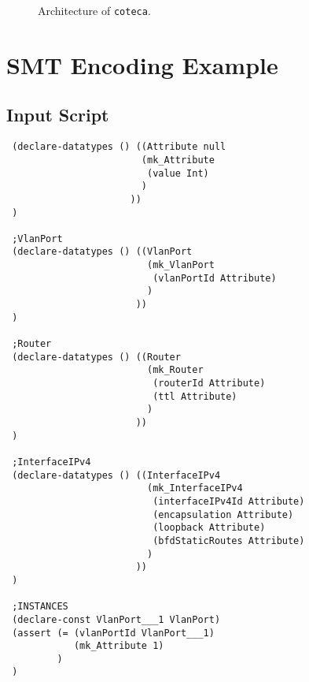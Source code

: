 \documentclass[12pt,swedish,english]{report}
\theoremstyle{definition}
\begin{document}
\begin{appendices}
\begin{figure}[h]
 \caption{Architecture of \texttt{coteca}.}
 \label{fig:architecture}

 \end{figure}
 
 
 \chapter{SMT Encoding Example}\label{app:smtOutput}
 
 \section{Input Script}
 \begin{verbatim}
 (declare-datatypes () ((Attribute null
 	                    (mk_Attribute
 	                     (value Int)
 	                    )
 	                  ))
 )
 
 ;VlanPort
 (declare-datatypes () ((VlanPort
                         (mk_VlanPort
                          (vlanPortId Attribute)
                         )
                       ))
 )
 
 ;Router
 (declare-datatypes () ((Router 
                         (mk_Router
                          (routerId Attribute)
                          (ttl Attribute)
                         )
                       ))
 )
 
 ;InterfaceIPv4 
 (declare-datatypes () ((InterfaceIPv4
                         (mk_InterfaceIPv4
                          (interfaceIPv4Id Attribute)
                          (encapsulation Attribute)
                          (loopback Attribute)
                          (bfdStaticRoutes Attribute)
                         )
                       ))
 )
 
 ;INSTANCES
 (declare-const VlanPort___1 VlanPort)
 (assert (= (vlanPortId VlanPort___1) 
            (mk_Attribute 1)
         )
 )
 

\end{verbatim}
\end{appendices}
\end{document}
